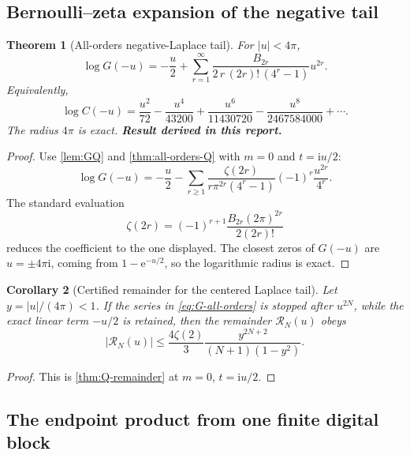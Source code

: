 \documentclass[11pt,oneside]{article}
\numberwithin{equation}{section}
\newtheorem{theorem}{Theorem}[section]
\newtheorem{corollary}[theorem]{Corollary}
\theoremstyle{definition}
\theoremstyle{remark}
\newcommand{\e}{\mathrm e}
\newcommand{\ii}{\mathrm i}
\newcommand{\newresult}{\textbf{Result derived in this report.}}
\begin{document}
\subsection{Bernoulli--zeta expansion of the negative tail}

\begin{theorem}[All-orders negative-Laplace tail]
\label{thm:G-all-orders}
For $|u|<4\pi$,
\begin{equation}
 \boxed{
 \log G(-u)
 =-\frac{u}{2}
 +\sum_{r=1}^{\infty}
 \frac{B_{2r}}{2\,r\,(2r)!\,(4^r-1)}u^{2r}.}
 \label{eq:G-all-orders}
\end{equation}
Equivalently,
\begin{equation}
 \log C(-u)
 =\frac{u^2}{72}-\frac{u^4}{43200}
  +\frac{u^6}{11430720}-\frac{u^8}{2467584000}+\cdots.
 \label{eq:C-first}
\end{equation}
The radius $4\pi$ is exact.
\newresult
\end{theorem}

\begin{proof}
Use \cref{lem:GQ} and \cref{thm:all-orders-Q} with $m=0$ and $t=\ii u/2$:
\[
 \log G(-u)=-\frac u2
 -\sum_{r\ge1}\frac{\zeta(2r)}{r\pi^{2r}(4^r-1)}
 (-1)^r\frac{u^{2r}}{4^r}.
\]
The standard evaluation
\[
 \zeta(2r)=(-1)^{r+1}\frac{B_{2r}(2\pi)^{2r}}{2(2r)!}
\]
reduces the coefficient to the one displayed.  The closest zeros of $G(-u)$ are
$u=\pm4\pi\ii$, coming from $1-\e^{-u/2}$, so the logarithmic radius is exact.
\end{proof}

\begin{corollary}[Certified remainder for the centered Laplace tail]
\label{cor:G-remainder}
Let $y=|u|/(4\pi)<1$.  If the series in \eqref{eq:G-all-orders} is stopped after $u^{2N}$,
while the exact linear term $-u/2$ is retained, then the remainder $\mathcal R_N(u)$ obeys
\begin{equation}
 |\mathcal R_N(u)|
 \le \frac{4\zeta(2)}{3}
 \frac{y^{2N+2}}{(N+1)(1-y^2)}.
 \label{eq:G-rem}
\end{equation}
\end{corollary}

\begin{proof}
This is \cref{thm:Q-remainder} at $m=0$, $t=\ii u/2$.
\end{proof}

\subsection{The endpoint product from one finite digital block}
\end{document}
